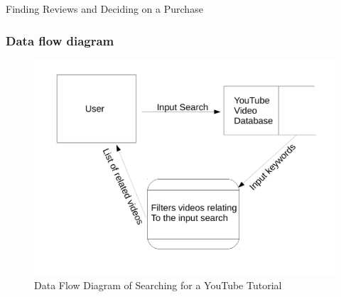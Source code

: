 \begin{algorithm}[H]
    \caption{Finding Reviews and Deciding on a Purchase}
\begin{algorithmic}[1]
\State
{}


\EndIf
        \Else
\EndIf
    \EndIf
\EndWhile
\end{algorithmic}
\end{algorithm}

\subsubsection{Data flow diagram}

\begin{figure}[H]
    \includegraphics[width=\textwidth]{./Analysis/YouTubeVideoSearch.pdf}
    \caption{Data Flow Diagram of Searching for a YouTube Tutorial} \label{fig:Searching for a YouTube Tutorial}
\end{figure}

